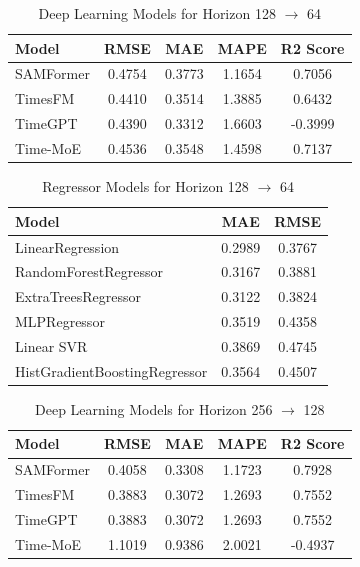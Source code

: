 \begin{table}[h!]
     \centering
     \begin{tabular}{lcccc}
     \hline
     Model & RMSE  & MAE   & MAPE  & R2 Score \\
     \hline
     SAMFormer   & 0.4754 & 0.3773 & 1.1654 & 0.7056 \\
     TimesFM     & 0.4410 & 0.3514 & 1.3885 & 0.6432 \\
     TimeGPT     & 0.4390 & 0.3312 & 1.6603 & -0.3999 \\
     Time-MoE    & 0.4536 & 0.3548 & 1.4598 & 0.7137 \\
     \hline
     \end{tabular}
     \caption{Deep Learning Models for Horizon 128 $\to$ 64}
     \label{tab:weather_128to64_dl}
\end{table}
     

\begin{table}[h!]
     \centering
     \begin{tabular}{lcc}
     \hline
     Model & MAE   & RMSE  \\
     \hline
     LinearRegression                & 0.2989 & 0.3767 \\
     RandomForestRegressor           & 0.3167 & 0.3881 \\
     ExtraTreesRegressor             & 0.3122 & 0.3824 \\
     MLPRegressor                    & 0.3519 & 0.4358 \\
     Linear SVR                      & 0.3869 & 0.4745 \\
     HistGradientBoostingRegressor   & 0.3564 & 0.4507 \\
     \hline
     \end{tabular}
     \caption{Regressor Models for Horizon 128 $\to$ 64}
     \label{tab:weather_128to64_reg}
\end{table}
     


\begin{table}[h!]
     \centering
     \begin{tabular}{lcccc}
     \hline
     Model & RMSE  & MAE   & MAPE  & R2 Score \\
     \hline
     SAMFormer   & 0.4058 & 0.3308 & 1.1723 & 0.7928 \\
     TimesFM     & 0.3883 & 0.3072 & 1.2693 & 0.7552 \\
     TimeGPT     & 0.3883 & 0.3072 & 1.2693 & 0.7552 \\
     Time-MoE    & 1.1019 & 0.9386 & 2.0021 & -0.4937 \\
     \hline
     \end{tabular}
     \caption{Deep Learning Models for Horizon 256 $\to$ 128}
     \label{tab:weather_256to128_dl}
\end{table}
     

